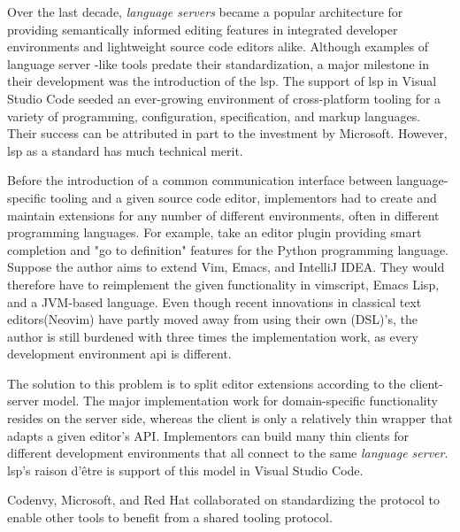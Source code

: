 Over the last decade,
\emph{language servers} became a popular architecture for providing semantically
informed editing features in integrated developer environments and lightweight
source code editors alike. Although examples of language server -like tools
predate their standardization, a major milestone in their development was the
introduction of the \acrfull{lsp}.
The support of \acrshort{lsp} in Visual Studio Code seeded an ever-growing
environment of cross-platform tooling for a variety of programming,
configuration, specification, and markup languages. Their success can be
attributed in part to the investment by Microsoft. However, \acrshort{lsp} as a
standard has much technical merit.

Before the introduction of a common communication interface between
language-specific tooling and a given source code editor, implementors had to
create and maintain extensions for any number of different environments, often
in different programming languages. For example, take an editor plugin providing
smart completion and "go to definition" features for the Python programming
language. Suppose the author aims to extend Vim, Emacs, and IntelliJ IDEA. They
would therefore have to reimplement the given functionality in vimscript, Emacs
Lisp, and a JVM-based language. Even though recent innovations in classical text
editors(Neovim) have partly moved away from using their own (DSL)'s, the author
is still burdened with three times the implementation work, as every development
environment \acrshort{api} is different.

The solution to this problem is to split editor extensions according to the
client-server model. The major implementation work for domain-specific
functionality resides on the server side, whereas the client is only a
relatively thin wrapper that adapts a given editor's API. Implementors can build
many thin clients for different development environments that all connect to the
same \emph{language server}. \acrshort{lsp}'s raison d'être is support of this
model in Visual Studio Code.

Codenvy, Microsoft, and Red Hat collaborated on standardizing the protocol to
enable other tools to benefit from a shared tooling protocol. %

